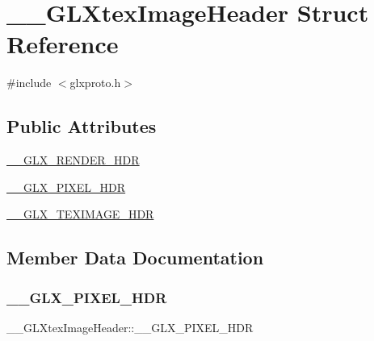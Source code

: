 \hypertarget{struct_____g_l_xtex_image_header}{}\section{\+\_\+\+\_\+\+G\+L\+Xtex\+Image\+Header Struct Reference}
\label{struct_____g_l_xtex_image_header}


{\ttfamily \#include $<$glxproto.\+h$>$}

\subsection*{Public Attributes}
\begin{DoxyCompactItemize}
\item 
\hyperlink{struct_____g_l_xtex_image_header_a36ab9f20e0287fa296cd023efde33c12}{\+\_\+\+\_\+\+G\+L\+X\+\_\+\+R\+E\+N\+D\+E\+R\+\_\+\+H\+DR}
\item 
\hyperlink{struct_____g_l_xtex_image_header_a0894024052e8ef7c7fbe791ee9e52e7d}{\+\_\+\+\_\+\+G\+L\+X\+\_\+\+P\+I\+X\+E\+L\+\_\+\+H\+DR}
\item 
\hyperlink{struct_____g_l_xtex_image_header_a4680e6e13bbe7d3082073ff1d01bb11c}{\+\_\+\+\_\+\+G\+L\+X\+\_\+\+T\+E\+X\+I\+M\+A\+G\+E\+\_\+\+H\+DR}
\end{DoxyCompactItemize}


\subsection{Member Data Documentation}
\mbox{\label{struct_____g_l_xtex_image_header_a0894024052e8ef7c7fbe791ee9e52e7d}} 
\subsubsection{\texorpdfstring{\+\_\+\+\_\+\+G\+L\+X\+\_\+\+P\+I\+X\+E\+L\+\_\+\+H\+DR}{\_\_GLX\_PIXEL\_HDR}}
{\footnotesize\ttfamily \+\_\+\+\_\+\+G\+L\+Xtex\+Image\+Header\+::\+\_\+\+\_\+\+G\+L\+X\+\_\+\+P\+I\+X\+E\+L\+\_\+\+H\+DR}

